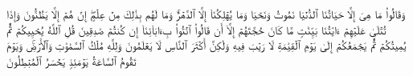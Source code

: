 \stopbuffer
\startbuffer[\q:45:24]
وَقَالُوا۟ مَا هِیَ إِلَّا حَیَاتُنَا ٱلدُّنۡیَا نَمُوتُ وَنَحۡیَا وَمَا یُهۡلِكُنَاۤ إِلَّا ٱلدَّهۡرُۚ وَمَا لَهُم بِذَٰلِكَ مِنۡ عِلۡمٍۖ إِنۡ هُمۡ إِلَّا یَظُنُّونَ%
\stopbuffer
\startbuffer[\q:45:25]
وَإِذَا تُتۡلَىٰ عَلَیۡهِمۡ ءَایَٰتُنَا بَیِّنَٰتࣲ مَّا كَانَ حُجَّتَهُمۡ إِلَّاۤ أَن قَالُوا۟ ٱئۡتُوا۟ بِءَابَاۤئِنَاۤ إِن كُنتُمۡ صَٰدِقِینَ%
\stopbuffer
\startbuffer[\q:45:26]
قُلِ ٱللَّهُ یُحۡیِیكُمۡ ثُمَّ یُمِیتُكُمۡ ثُمَّ یَجۡمَعُكُمۡ إِلَىٰ یَوۡمِ ٱلۡقِیَٰمَةِ لَا رَیۡبَ فِیهِ وَلَٰكِنَّ أَكۡثَرَ ٱلنَّاسِ لَا یَعۡلَمُونَ%
\stopbuffer
\startbuffer[\q:45:27]
وَلِلَّهِ مُلۡكُ ٱلسَّمَٰوَٰتِ وَٱلۡأَرۡضِۚ وَیَوۡمَ تَقُومُ ٱلسَّاعَةُ یَوۡمَئِذࣲ یَخۡسَرُ ٱلۡمُبۡطِلُونَ%
\stopbuffer
